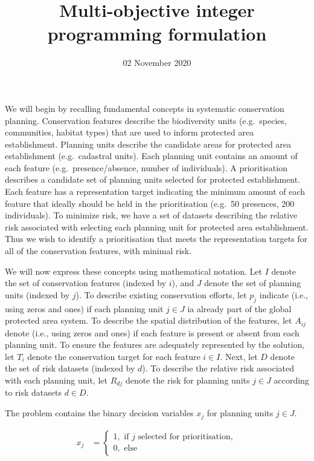 \documentclass[
  11pt,
]{article}
\title{Multi-objective integer programming formulation}
\author{}
\date{\vspace{-2.5em}02 November 2020}
\begin{document}
\maketitle

We will begin by recalling fundamental concepts in systematic
conservation planning. Conservation features describe the biodiversity
units (e.g.~species, communities, habitat types) that are used to inform
protected area establishment. Planning units describe the candidate
areas for protected area establishment (e.g.~cadastral units). Each
planning unit contains an amount of each feature (e.g.~presence/absence,
number of individuals). A prioritisation describes a candidate set of
planning units selected for protected establishment. Each feature has a
representation target indicating the minimum amount of each feature that
ideally should be held in the prioritisation (e.g.~50 presences, 200
individuals). To minimize risk, we have a set of datasets describing the
relative risk associated with selecting each planning unit for protected
area establishment. Thus we wish to identify a prioritisation that meets
the representation targets for all of the conservation features, with
minimal risk.

We will now express these concepts using mathematical notation. Let
\(I\) denote the set of conservation features (indexed by \(i\)), and
\(J\) denote the set of planning units (indexed by \(j\)). To describe
existing conservation efforts, let \(p_j\) indicate (i.e., using zeros
and ones) if each planning unit \(j \in J\) ia already part of the
global protected area system. To describe the spatial distribution of
the features, let \(A_{ij}\) denote (i.e., using zeros and ones) if each
feature is present or absent from each planning unit. To ensure the
features are adequately represented by the solution, let \(T_i\) denote
the conservation target for each feature \(i \in I\). Next, let \(D\)
denote the set of risk datasets (indexed by \(d\)). To describe the
relative risk associated with each planning unit, let \(R_{dj}\) denote
the risk for planning units \(j \in J\) according to risk datasets
\(d \in D\).

\clearpage

The problem contains the binary decision variables \(x_j\) for planning
units \(j \in J\).

\begin{align*}
x_j &=
\begin{cases}
1, \text{ if $j$ selected for prioritisation}, \tag{eqn 1a} \\
0, \text{ else }
\end{cases} \\
\end{align*}
\end{document}
